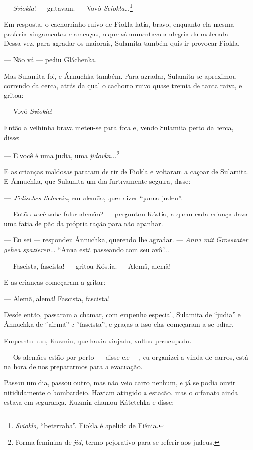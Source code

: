 --- \emph{Sviokla}! --- gritavam. --- Vovó \emph{Sviokla}...\footnote{\emph{Sviokla,}
  ``beterraba''. Fiokla é apelido de Fiénia.}

Em resposta, o cachorrinho ruivo de Fiokla latia, bravo, enquanto ela
mesma proferia xingamentos e ameaças, o que só aumentava a alegria da
molecada. Dessa vez, para agradar os maiorais, Sulamita também quis ir
provocar Fiokla.

--- Não vá --- pediu Gláchenka.

Mas Sulamita foi, e Ánnuchka também. Para agradar, Sulamita se aproximou
correndo da cerca, atrás da qual o cachorro ruivo quase tremia de tanta
raiva, e gritou:

--- Vovó \emph{Sviokla}!

Então a velhinha brava meteu-se para fora e, vendo Sulamita perto da
cerca, disse:

--- E você é uma judia, uma \emph{jidovka}...\footnote{Forma feminina de
  \emph{jid}, termo pejorativo para se referir aos judeus.}

E as crianças maldosas pararam de rir de Fiokla e voltaram a caçoar de
Sulamita. E Ánnuchka, que Sulamita um dia furtivamente seguira, disse:

--- \emph{Jüdisches Schwein}, em alemão, quer dizer ``porco judeu''.

--- Então você sabe falar alemão? --- perguntou Kóstia, a quem cada
criança dava uma fatia de pão da própria ração para não apanhar.

--- Eu sei --- respondeu Ánnuchka, querendo lhe agradar. --- \emph{Anna
mit Grossvater gehen spazieren}... ``Anna está passeando com seu
avô''...

--- Fascista, fascista! --- gritou Kóstia. --- Alemã, alemã!

E as crianças começaram a gritar:

--- Alemã, alemã! Fascista, fascista!

Desde então, passaram a chamar, com empenho especial, Sulamita de
``judia'' e Ánnuchka de ``alemã'' e ``fascista'', e graças a isso elas
começaram a se odiar.

Enquanto isso, Kuzmin, que havia viajado, voltou preocupado.

--- Os alemães estão por perto --- disse ele ---, eu organizei a vinda
de carros, está na hora de nos prepararmos para a evacuação.

Passou um dia, passou outro, mas não veio carro nenhum, e já se podia
ouvir nitididamente o bombardeio. Haviam atingido a estação, mas o
orfanato ainda estava em segurança. Kuzmin chamou Kátetchka e disse:

